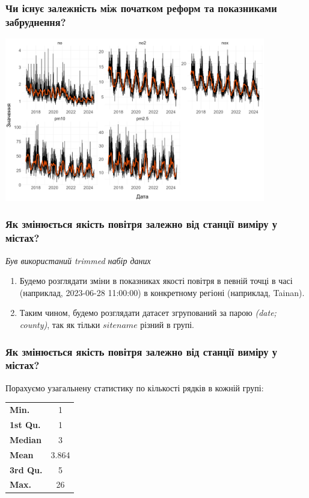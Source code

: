 \documentclass{beamer}
\begin{document}
\begin{frame}
  \frametitle{Чи існує залежність між початком реформ та показниками забруднення?}

  \begin{center}
    \includegraphics[height=2.8in]{plots/question6/line-p2.png}
  \end{center}
\end{frame}


\begin{frame}
  \frametitle{Як змінюється якість повітря залежно від станції виміру у містах?}

  \textit{Був використаний trimmed набір даних}

  \begin{enumerate}
    \item Будемо розглядати зміни в показниках якості повітря в певній точці в часі (наприклад, 2023-06-28 11:00:00) в
    конкретному регіоні (наприклад, Tainan).
    \item Таким чином, будемо розглядати датасет згрупований за парою \textit{(date; county)}, так як тільки $sitename$ різний в групі.
  \end{enumerate}
\end{frame}

\begin{frame}
  \frametitle{Як змінюється якість повітря залежно від станції виміру у містах?}

  Порахуємо узагальнену статистику по кількості рядків в кожній групі:

  \begin{center}
    \begin{tabular}{lc}
      \textbf{Min.}    & 1     \\
      \textbf{1st Qu.} & 1     \\
      \textbf{Median}  & 3     \\
      \textbf{Mean}    & 3.864 \\
      \textbf{3rd Qu.} & 5     \\
      \textbf{Max.}    & 26    \\
    \end{tabular}
  \end{center}
\end{frame}
\end{document}

